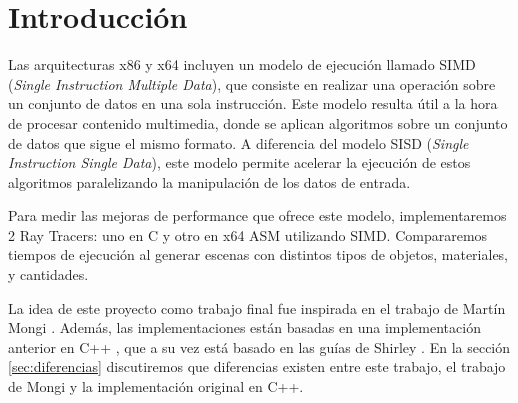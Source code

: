 \section{Introducción} \label{sec:introduccion}

Las arquitecturas x86 y x64 incluyen un modelo de ejecución llamado SIMD
(\textit{Single Instruction Multiple Data}), que consiste en realizar una
operación sobre un conjunto de datos en una sola instrucción. Este modelo
resulta útil a la hora de procesar contenido multimedia, donde se aplican
algoritmos sobre un conjunto de datos que sigue el mismo formato. A diferencia
del modelo SISD (\textit{Single Instruction Single Data}), este modelo permite
acelerar la ejecución de estos algoritmos paralelizando la manipulación de los
datos de entrada.

Para medir las mejoras de performance que ofrece este modelo, implementaremos 2
Ray Tracers: uno en C y otro en x64 ASM utilizando SIMD. Compararemos tiempos de
ejecución al generar escenas con distintos tipos de objetos, materiales, y
cantidades.

La idea de este proyecto como trabajo final fue inspirada en el trabajo de
Martín Mongi \cite{rtmartin}. Además, las implementaciones están basadas en una
implementación anterior en C++ \cite{RayTracerCpp}, que a su vez está basado en
las guías de Shirley \cite{RTIOW}. En la sección \ref{sec:diferencias}
discutiremos que diferencias existen entre este trabajo, el trabajo de Mongi y
la implementación original en C++.
